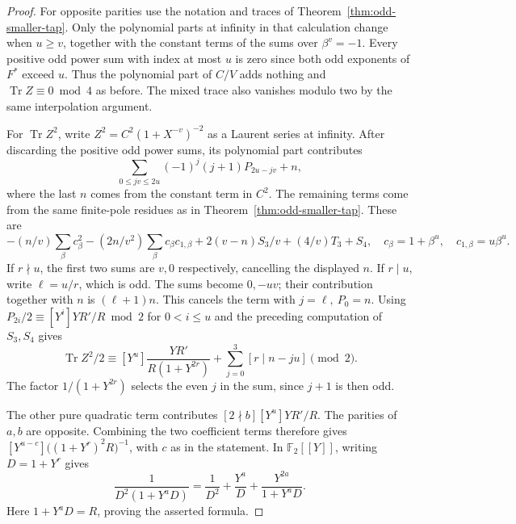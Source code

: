 \documentclass[11pt]{article}
\newcommand{\F}{\mathbb F_2}
\begin{document}
\begin{proof}
For opposite parities use the notation and traces of
Theorem~\ref{thm:odd-smaller-tap}. Only the polynomial parts at
infinity in that calculation change when \(u\ge v\), together with
the constant terms of the sums over \(\beta^v=-1\).
Every positive odd power sum with index at most \(u\) is zero since
both odd exponents of \(F^*\) exceed \(u\). Thus the polynomial
part of \(C/V\) adds nothing and \(\operatorname{Tr} Z\equiv0\bmod4\)
as before. The mixed trace also vanishes modulo two by the same
interpolation argument.

For \(\operatorname{Tr} Z^2\), write \(Z^2=C^2(1+X^{-v})^{-2}\)
as a Laurent series at infinity. After discarding the positive odd
power sums, its polynomial part contributes
\[
 \sum_{0\le jv\le 2u}(-1)^j(j+1)P_{2u-jv}+n ,
\]
where the last \(n\) comes from the constant term in \(C^2\).
The remaining terms come from the same finite-pole residues as in
Theorem~\ref{thm:odd-smaller-tap}. These are
\[
  -(n/v)\sum_\beta c_\beta^2-(2n/v^2)\sum_\beta c_\beta c_{1,\beta}
       +2(v-n)S_3/v+(4/v)T_3+S_4 ,
 \quad c_\beta=1+\beta^u,\quad c_{1,\beta}=u\beta^u .
\]
If \(r\nmid u\), the first two sums are \(v,0\) respectively, cancelling
the displayed \(n\). If \(r\mid u\), write \(\ell=u/r\), which is odd.
The sums become \(0,-uv\); their contribution together with \(n\) is
\((\ell+1)n\). This cancels the term with \(j=\ell,\ P_0=n\).
Using \(P_{2i}/2\equiv[Y^i]YR'/R\bmod2\) for \(0<i\le u\)
and the preceding computation of \(S_3,S_4\) gives
\[
 \operatorname{Tr}Z^2/2\equiv
 [Y^u]\frac{YR'}{R(1+Y^{2r})}
       +\sum_{j=0}^3[r\mid n-ju]\pmod2.
\]
The factor \(1/(1+Y^{2r})\) selects the even \(j\) in the sum, since
\(j+1\) is then odd.

The other pure quadratic term contributes \([2\nmid b][Y^u]YR'/R\).
The parities of \(a,b\) are opposite. Combining the two coefficient
terms therefore gives \([Y^{u-c}]\big((1+Y^r)^2 R\big)^{-1}\), with \(c\) as in
the statement. In \(\F[[Y]]\), writing \(D=1+Y^r\) gives
\[
 \frac1{D^2(1+Y^aD)}
  =\frac1{D^2}+\frac{Y^a}{D}+\frac{Y^{2a}}{1+Y^aD}.
\]
Here \(1+Y^aD=R\), proving the asserted formula.


\end{proof}
\end{document}
